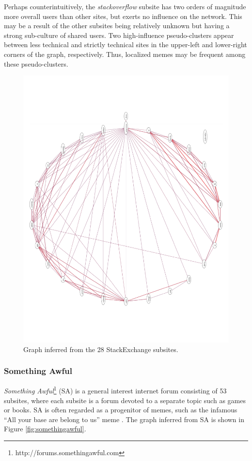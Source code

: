 \documentclass{article} %
\begin{document}
Perhaps counterintuitively, the \textit{stackoverflow} subsite has two orders of magnitude more overall users than other sites, but exerts no influence on the network. This may be a result of the other subsites being relatively unknown but having a strong sub-culture of shared users. Two high-influence pseudo-clusters appear between less technical and strictly technical sites in the upper-left and lower-right corners of the graph, respectively. Thus, localized memes may be frequent among these pseudo-clusters.

\begin{figure}[htb]
\centering
\includegraphics[width=\textwidth]{stackexchange.pdf}
\caption{Graph inferred from the 28 StackExchange subsites.}
\label{fig:stackexchange}
\end{figure}

\subsubsection{Something Awful}
\textit{Something Awful}\footnote{http://forums.somethingawful.com} (SA) is a general interest internet forum consisting of 53 subsites, where each subsite is a forum devoted to a separate topic such as games or books. SA is often regarded as a progenitor of memes, such as the infamous ``All your base are belong to us'' meme \cite{allyourbase}. The graph inferred from SA is shown in Figure \ref{fig:somethingawful}.
\end{document}
